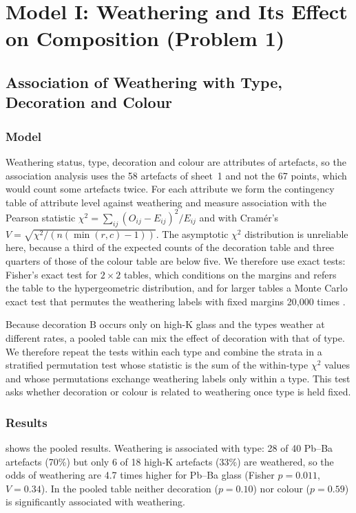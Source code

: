 \documentclass[11pt,a4paper]{article}
\begin{document}
\section{Model I: Weathering and Its Effect on Composition (Problem 1)}\label{sec:q1}

\subsection{Association of Weathering with Type, Decoration and Colour}

\subsubsection{Model}
Weathering status, type, decoration and colour are attributes of artefacts, so the association analysis uses the 58 artefacts of sheet~1 and not the 67 points, which would count some artefacts twice.
For each attribute we form the contingency table of attribute level against weathering and measure association with the Pearson statistic $\chi^2=\sum_{ij}(O_{ij}-E_{ij})^2/E_{ij}$ and with Cram\'er's $V=\sqrt{\chi^2/(n(\min(r,c)-1))}$.
The asymptotic $\chi^2$ distribution is unreliable here, because a third of the expected counts of the decoration table and three quarters of those of the colour table are below five.
We therefore use exact tests: Fisher's exact test for $2\times2$ tables, which conditions on the margins and refers the table to the hypergeometric distribution, and for larger tables a Monte Carlo exact test that permutes the weathering labels with fixed margins 20{,}000 times \citep{agresti2002}.

Because decoration B occurs only on high-K glass and the types weather at different rates, a pooled table can mix the effect of decoration with that of type.
We therefore repeat the tests within each type and combine the strata in a stratified permutation test whose statistic is the sum of the within-type $\chi^2$ values and whose permutations exchange weathering labels only within a type.
This test asks whether decoration or colour is related to weathering once type is held fixed.

\subsubsection{Results}
 shows the pooled results.
Weathering is associated with type: 28 of 40 Pb--Ba artefacts (70\%) but only 6 of 18 high-K artefacts (33\%) are weathered, so the odds of weathering are 4.7 times higher for Pb--Ba glass (Fisher $p=0.011$, $V=0.34$).
In the pooled table neither decoration ($p=0.10$) nor colour ($p=0.59$) is significantly associated with weathering.
\end{document}
